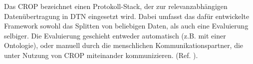 Das \gls{CROP} bezeichnet einen Protokoll-Stack, der zur relevanzabh{\"a}ngigen
Daten{\"u}bertragung in \gls{DTN} eingesetzt wird. Dabei
umfasst das daf{\"u}r entwickelte Framework sowohl das Splitten von beliebigen
Daten, als auch eine Evaluierung selbiger. Die Evaluierung geschieht entweder
automatisch (z.B. mit einer Ontologie), oder manuell durch die menschlichen
Kommunikationspartner, die unter Nutzung von CROP miteinander kommunizieren. (Ref.
\cite{Daher}).
